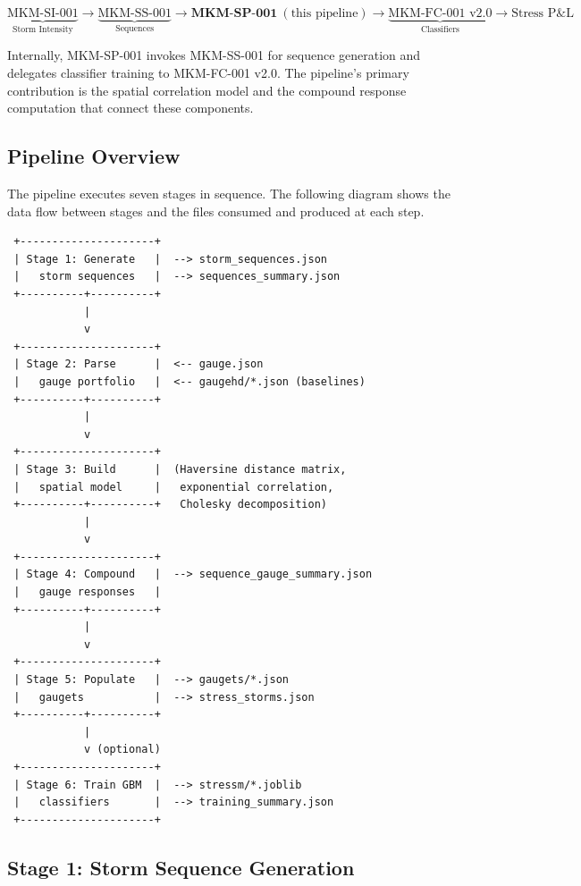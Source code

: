 \documentclass[11pt,a4paper]{article}
\begin{document}
\[
\underbrace{\text{MKM-SI-001}}_{\text{Storm Intensity}}
\to
\underbrace{\text{MKM-SS-001}}_{\text{Sequences}}
\to
\boxed{\textbf{MKM-SP-001}\ (\text{this pipeline})}
\to
\underbrace{\text{MKM-FC-001 v2.0}}_{\text{Classifiers}}
\to
\text{Stress P\&L}
\]

\noindent Internally, MKM-SP-001 invokes MKM-SS-001 for sequence generation and
delegates classifier training to MKM-FC-001 v2.0. The pipeline's primary
contribution is the spatial correlation model and the compound response
computation that connect these components.

\mkmframework

\subsection{Pipeline Overview}

The pipeline executes seven stages in sequence. The following diagram shows
the data flow between stages and the files consumed and produced at each step.

\begin{center}
\begin{verbatim}
 +---------------------+
 | Stage 1: Generate   |  --> storm_sequences.json
 |   storm sequences   |  --> sequences_summary.json
 +----------+----------+
            |
            v
 +---------------------+
 | Stage 2: Parse      |  <-- gauge.json
 |   gauge portfolio   |  <-- gaugehd/*.json (baselines)
 +----------+----------+
            |
            v
 +---------------------+
 | Stage 3: Build      |  (Haversine distance matrix,
 |   spatial model     |   exponential correlation,
 +----------+----------+   Cholesky decomposition)
            |
            v
 +---------------------+
 | Stage 4: Compound   |  --> sequence_gauge_summary.json
 |   gauge responses   |
 +----------+----------+
            |
            v
 +---------------------+
 | Stage 5: Populate   |  --> gaugets/*.json
 |   gaugets           |  --> stress_storms.json
 +----------+----------+
            |
            v (optional)
 +---------------------+
 | Stage 6: Train GBM  |  --> stressm/*.joblib
 |   classifiers       |  --> training_summary.json
 +---------------------+
\end{verbatim}
\end{center}

\subsection{Stage 1: Storm Sequence Generation}
\end{document}
